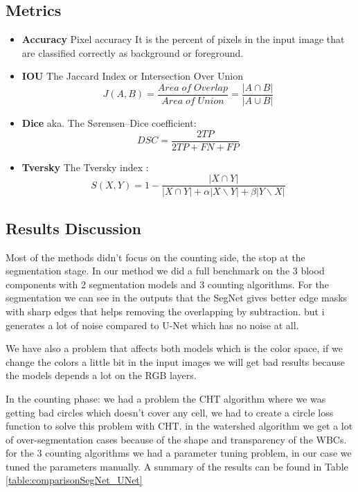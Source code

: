 \documentclass[conference]{IEEEtran}
\begin{document}
\subsection{Metrics}
\begin{itemize}
    \item \textbf{Accuracy} Pixel accuracy It is the percent of pixels in the input image that are classified correctly as background or foreground.
    \item \textbf{IOU} The Jaccard Index or Intersection Over Union 
        \begin{equation}
        J(A,B) = \frac{Area\; of\; Overlap}{Area\; of\; Union} = \frac{|A \cap B|}{|A \cup B|}
        \end{equation}
    \item \textbf{Dice} aka. The Sørensen–Dice coefficient:
        \begin{equation}
            DSC = \frac{2 TP}{2 TP + FN + FP}
        \end{equation}
    \item \textbf{Tversky} The Tversky index :
        \begin{equation}
        S(X, Y) = 1-\frac{| X \cap Y |}{| X \cap Y | + \alpha|X \backslash Y| + \beta |Y \backslash X|}
        \end{equation}
\end{itemize}

\subsection{Results Discussion}
Most of the methods didn't focus on the counting side, the stop at the segmentation stage. In our method we did a full benchmark on the 3 blood components with 2 segmentation models and 3 counting algorithms.
For the segmentation we can see in the outputs that the SegNet gives better edge masks with sharp edges that helps removing the overlapping by subtraction. but i generates a lot of noise compared to U-Net which has no noise at all.

We have also a problem that affects both models which is the color space, if we change the colors a little bit in the input images we will get bad results because the models depends a lot on the RGB layers.

In the counting phase:
we had a problem the CHT algorithm where we was getting bad circles which doesn't cover any cell, we had to create a circle loss function to solve this problem with CHT.
in the watershed algorithm we get a lot of over-segmentation cases because of the shape and transparency of the WBCs.
for the 3 counting algorithms we had a parameter tuning problem, in our case we tuned the parameters manually. A summary of the results can be found in Table \ref{table:comparisonSegNet_UNet}
\end{document}
